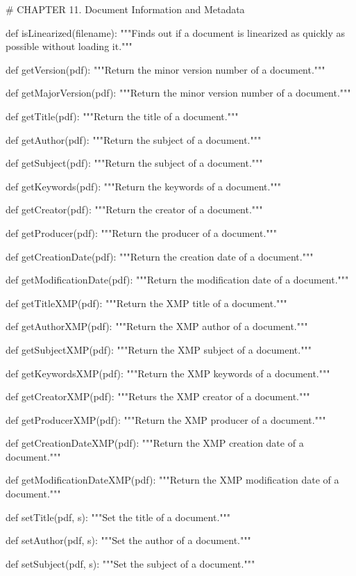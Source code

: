 # CHAPTER 11. Document Information and Metadata

def isLinearized(filename):
    """Finds out if a document is linearized as quickly
    as possible without loading it."""

def getVersion(pdf):
    """Return the minor version number of a document."""

def getMajorVersion(pdf):
    """Return the minor version number of a document."""

def getTitle(pdf):
    """Return the title of a document."""

def getAuthor(pdf):
    """Return the subject of a document."""

def getSubject(pdf):
    """Return the subject of a document."""

def getKeywords(pdf):
    """Return the keywords of a document."""

def getCreator(pdf):
    """Return the creator of a document."""

def getProducer(pdf):
    """Return the producer of a document."""

def getCreationDate(pdf):
    """Return the creation date of a document."""

def getModificationDate(pdf):
    """Return the modification date of a document."""

def getTitleXMP(pdf):
    """Return the XMP title of a document."""

def getAuthorXMP(pdf):
    """Return the XMP author of a document."""

def getSubjectXMP(pdf):
    """Return the XMP subject of a document."""

def getKeywordsXMP(pdf):
    """Return the XMP keywords of a document."""

def getCreatorXMP(pdf):
    """Returs the XMP creator of a document."""

def getProducerXMP(pdf):
    """Return the XMP producer of a document."""

def getCreationDateXMP(pdf):
    """Return the XMP creation date of a document."""

def getModificationDateXMP(pdf):
    """Return the XMP modification date of a document."""

def setTitle(pdf, s):
    """Set the title of a document."""

def setAuthor(pdf, s):
    """Set the author of a document."""

def setSubject(pdf, s):
    """Set the subject of a document."""

